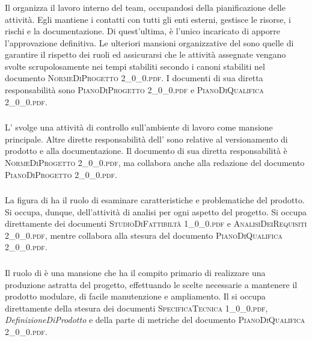 		\subsubsection{\RdP}
		Il \textit{\RdP} organizza il lavoro interno del team, occupandosi della pianificazione delle attività. Egli mantiene i contatti con tutti gli enti esterni, gestisce le risorse, i rischi e la documentazione. Di quest'ultima, è l'unico incaricato di apporre l'approvazione definitiva. Le ulteriori mansioni organizzative del \textit{\RdP} sono quelle di garantire il rispetto dei ruoli ed assicurarsi che le attività assegnate vengano svolte scrupolosamente nei tempi stabiliti secondo i canoni stabiliti nel documento \textsc{NormeDiProgetto 2\_0\_0.pdf}. I documenti di sua diretta responsabilità sono \textsc{PianoDiProgetto 2\_0\_0.pdf} e \textsc{PianoDiQualifica 2\_0\_0.pdf}.

		\subsubsection{\Amm}
		L'\textit{\Amm} svolge una attività di controllo sull'ambiente di lavoro come mansione principale. Altre dirette responsabilità dell'\textit{\Amm} sono relative al versionamento di prodotto e alla documentazione. Il documento di sua diretta responsabilità è \textsc{NormeDiProgetto 2\_0\_0.pdf}, ma collabora anche alla redazione del documento \textsc{PianoDiProgetto 2\_0\_0.pdf}.
		
		\subsubsection{\Ana}
		La figura di \textit{\Ana} ha il ruolo di esaminare caratteristiche e problematiche del prodotto. Si occupa, dunque, dell'attività di analisi per ogni aspetto del progetto. Si occupa direttamente dei documenti \textsc{StudioDiFattibiltà 1\_0\_0.pdf} e \textsc{AnalisiDeiRequisiti 2\_0\_0.pdf}, mentre collabora alla stesura del documento \textsc{PianoDiQualifica 2\_0\_0.pdf}.

		\subsubsection{\Prog}
		Il ruolo di \textit{\Prog} è una mansione che ha il compito primario di realizzare una produzione astratta del progetto, effettuando le scelte necessarie a mantenere il prodotto modulare, di facile manutenzione e ampliamento. Il \textit{\Prog} si occupa direttamente della stesura dei documenti \textsc{SpecificaTecnica 1\_0\_0.pdf}, \textit{DefinizioneDiProdotto} e della parte di metriche del documento \textsc{PianoDiQualifica 2\_0\_0.pdf}.
		
